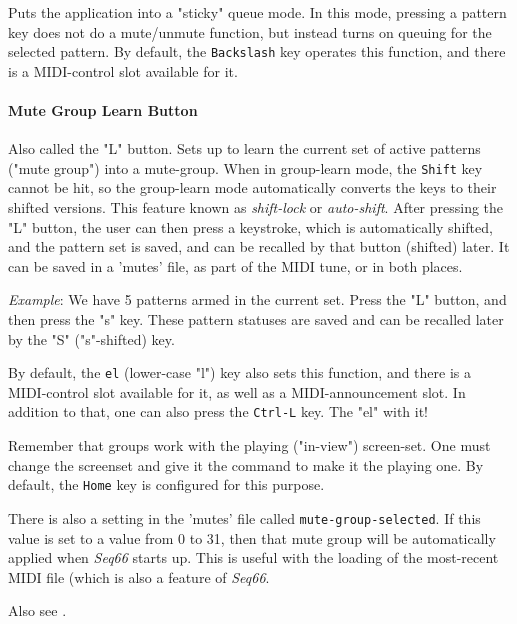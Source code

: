\documentclass[
 11pt,
 twoside,
 a4paper,
 final                                 %
]{article}
\begin{document}
   Puts the application into a "sticky" queue mode.
   In this mode, pressing a pattern key does not do a mute/unmute function, but
   instead turns on queuing for the selected pattern.
   By default, the \texttt{Backslash} key operates this function,
   and there is a MIDI-control slot available for it.

\paragraph{Mute Group Learn Button}
\label{paragraph:introduction_mute_group_learn_button}

   Also called the "L" button.
   Sets up to learn the current set of active patterns ("mute group") into a
   mute-group.
   When in group-learn mode, the \texttt{Shift} key cannot be hit, so the
   group-learn mode automatically converts the keys to their shifted versions.
   This feature known as \textsl{shift-lock} or \textsl{auto-shift}.
   After pressing the "L" button, the user can then press a keystroke, which is
   automatically shifted, and the pattern set is saved, and can be recalled by
   that button (shifted) later.  It can be saved in a 'mutes' file, as part of
   the MIDI tune, or in both places.

   \textsl{Example}:
   We have 5 patterns armed in the current set. Press the "L" button,
   and then press the "s" key.  These pattern statuses are saved and can be
   recalled later by the "S" ("s"-shifted) key.

   By default, the \texttt{el} (lower-case "l") key also sets this function,
   and there is a MIDI-control slot available for it, as well as a
   MIDI-announcement slot.
   In addition to that, one can also press
   the \texttt{Ctrl-L} key.
   The "el" with it!

   Remember that groups work with the playing ("in-view") screen-set.
   One must change the screenset and give it the command to make it the
   playing one.
   By default, the \texttt{Home} key is configured for this purpose.

   There is also a setting in the 'mutes' file called
   \texttt{mute-group-selected}.  If this value is set to a value from 0 to 31,
   then that mute group will be automatically applied when
   \textsl{Seq66} starts up.
   This is useful with the loading of the most-recent MIDI file (which is also
   a feature of \textsl{Seq66}.

   Also see .
\end{document}
